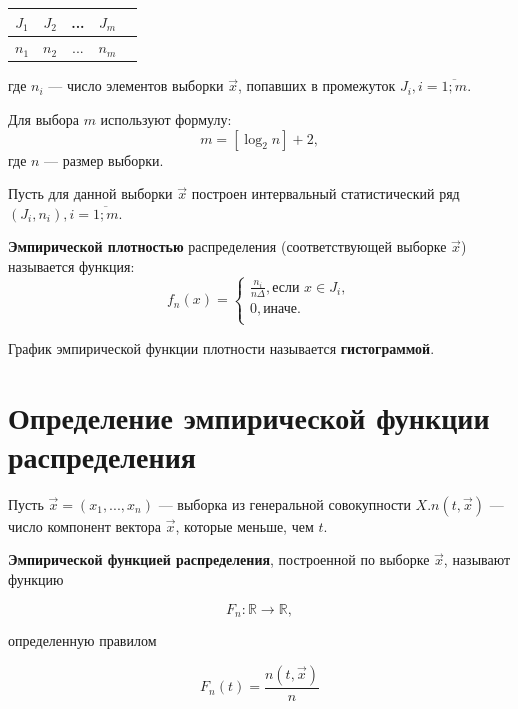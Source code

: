 \begin{table}[htb]
    \centering
    \begin{tabular}{|c|c|c|c|c|}
        \hline
        $J_1$ & $J_2$ & ... & $J_m$ \\
        \hline
        $n_1$ & $n_2$ & ... & $n_m$ \\
        \hline
    \end{tabular}
\end{table}

где $n_i$ --- число элементов выборки $\vec x$, попавших в промежуток $J_i, i = \overline{1; m}$.

Для выбора $m$ используют формулу: 
\begin{equation}
    m = [\log_2n] + 2,
\end{equation}
где $n$ --- размер выборки.

Пусть для данной выборки $\vec x$ построен интервальный статистический ряд $(J_i, n_i), i = \overline{1; m}$.

\textbf{Эмпирической плотностью} распределения (соответствующей выборке $\vec x$) называется функция:
\begin{equation}
    f_n(x) =
    \begin{cases}
        \frac{n_i}{n \Delta}, \text{если } x \in J_i,\\
        0, \text{иначе.} \\
    \end{cases}
\end{equation}

График эмпирической функции плотности называется \textbf{гистограммой}.

\section{Определение эмпирической функции распределения}

Пусть $\vec x = (x_1, ..., x_n)$ --- выборка из генеральной совокупности $X$. $n(t, \vec x)$ --- число компонент вектора $\vec x$, которые меньше, чем $t$.

\textbf{Эмпирической функцией распределения}, построенной по выборке $\vec x$, называют функцию

\begin{equation}
    F_n: \mathbb{R} \to \mathbb{R}, 
\end{equation}

определенную правилом

\begin{equation}
    F_n(t) = \frac{n(t, \vec x)}{n}
\end{equation}


